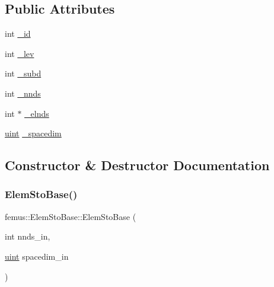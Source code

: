 \subsection*{Public Attributes}
\begin{DoxyCompactItemize}
\item 
int \mbox{\hyperlink{classfemus_1_1_elem_sto_base_a650ffa9b4e351ec4d16212d80b251dc7}{\+\_\+id}}
\item 
int \mbox{\hyperlink{classfemus_1_1_elem_sto_base_a21fac1582fea632435a5576ff9a6b6ac}{\+\_\+lev}}
\item 
int \mbox{\hyperlink{classfemus_1_1_elem_sto_base_ae2a0bc193975b623626a8eb58e549417}{\+\_\+subd}}
\item 
int \mbox{\hyperlink{classfemus_1_1_elem_sto_base_a87a91036236ff4407f5e1fb877d3c596}{\+\_\+nnds}}
\item 
int $\ast$ \mbox{\hyperlink{classfemus_1_1_elem_sto_base_a9d853484dcf998f1e3e1b2374e8c3b61}{\+\_\+elnds}}
\item 
\mbox{\hyperlink{_typedefs_8hpp_a91ad9478d81a7aaf2593e8d9c3d06a14}{uint}} \mbox{\hyperlink{classfemus_1_1_elem_sto_base_a300ec73a087a8df1257ac139b7e6648e}{\+\_\+spacedim}}
\end{DoxyCompactItemize}


\subsection{Constructor \& Destructor Documentation}
\mbox{\label{classfemus_1_1_elem_sto_base_ae6f3488589787d622037253092ce95b4}} 
\subsubsection{\texorpdfstring{Elem\+Sto\+Base()}{ElemStoBase()}}
{\footnotesize\ttfamily femus\+::\+Elem\+Sto\+Base\+::\+Elem\+Sto\+Base (\begin{DoxyParamCaption}\item[{int}]{nnds\+\_\+in,  }\item[{\mbox{\hyperlink{_typedefs_8hpp_a91ad9478d81a7aaf2593e8d9c3d06a14}{uint}}}]{spacedim\+\_\+in }\end{DoxyParamCaption})}

\mbox{\label{classfemus_1_1_elem_sto_base_a53ccb54619040fb0b77429bb89900a16}} 
